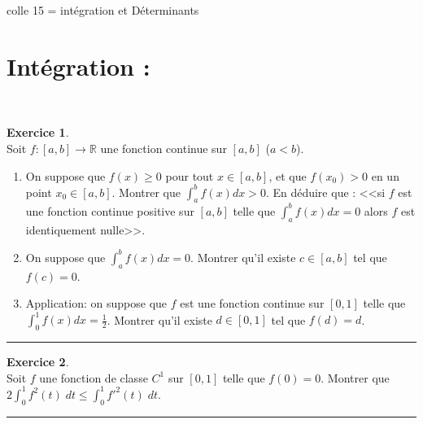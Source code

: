 \documentclass[a4paper,10pt]{article}
\theoremstyle{definition}
\theoremstyle{definition}
\newtheorem{exo}{Exercice}
\newcommand{\R}{\mathbb{R}}
\begin{document}
	
	
	\begin{center}
		\Large \sc colle 15 = intégration et Déterminants
	\end{center}








\section*{Intégration :}\hfill\\
\begin{minipage}{1\linewidth}
	\begin{minipage}[t]{0.48\linewidth}
		\raggedright
		
		
		
		\begin{exo}\quad\\
			Soit $f:[a,b]\rightarrow \R$ une fonction continue sur $[a,b]$ ($a<b$).
			\begin{enumerate}
				\item On suppose que $f(x) \ge 0$ pour tout $x\in [a,b]$, et que $f(x_0)>0$ en un point $x_0\in [a,b]$. 
				Montrer que $\int_a^b f(x) d x>0$. En déduire que : <<si $f$ est une fonction continue
				positive sur $[a,b]$ telle que $\int_a^b f(x) d x=0$ alors $f$ est
				identiquement nulle>>.
				\item On suppose que $\int_a^b f(x) d x=0$. Montrer qu'il existe $c\in [a,b]$ tel que $f(c)=0$. 
				\item Application: on suppose
				que $f$ est une fonction continue sur $[0,1]$ telle que $\int_0^1 f(x) dx=\frac 12$. 
				Montrer qu'il existe $d\in [0,1]$ tel que $f(d)=d$.
			\end{enumerate}
			
			\centering
			\rule{1\linewidth}{0.6pt}
		\end{exo}
		
			\begin{exo}\quad\\
			Soit $f$ une fonction de classe $C^1$ sur $[0,1]$ telle que $f(0)=0$. Montrer que $2\int_{0}^{1}f^2(t)\;dt\leq\int_{0}^{1}{f'}^2(t)\;dt$.
			
			\centering
			\rule{1\linewidth}{0.6pt}
		\end{exo}
	
	\end{minipage}	
	\hfill\vrule\hfill
	\begin{minipage}[t]{0.48\linewidth}
		\raggedright
		

\end{minipage}
\end{minipage}
\end{document}
